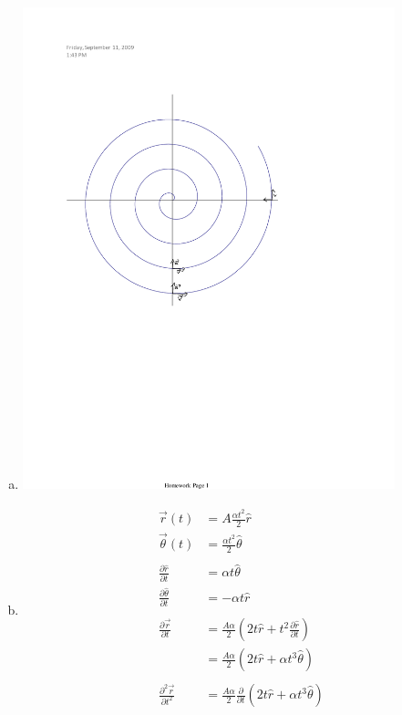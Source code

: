 \documentclass{esg8012pset}
\begin{document}
\begin{solution}
  \begin{enumerate}[a.]
    \item \includegraphics[width=0.85\textwidth]{ps01_Diagram_3}
    \item \begin{align*}
            \vec r(t) & = A\frac{\alpha t^2}{2} \hat r \\
            \vec \theta(t) & = \frac{\alpha t^2}{2} \hat\theta \\
            \\
            \frac{\partial \hat r}{\partial t} & = \alpha t \hat \theta \\
            \frac{\partial \hat \theta}{\partial t} & = -\alpha t \hat r \\
            \\
            \frac{\partial \vec r}{\partial t} & = \frac{A\alpha}{2}\left( 2t\hat r + t^2\frac{\partial \hat r}{\partial t}\right) \\
            & = \frac{A\alpha}{2}\left( 2t\hat r + \alpha t^3 \hat \theta\right) \\
            \\
            \frac{\partial^2 \vec r}{\partial t^2} & = \frac{A\alpha}{2}\frac{\partial}{\partial t}\left( 2t\hat r + \alpha t^3 \hat \theta\right) \\

\end{align*}
\end{enumerate}
\end{solution}
\end{document}
